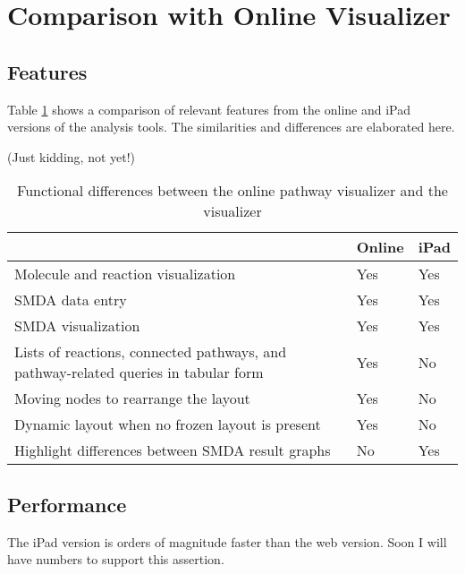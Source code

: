 \section{Comparison with Online \pathcasemaw Visualizer}
\label{sect:maw_comparison}

\subsection{Features}
\label{sect:maw_comparison_features}

Table \ref{fig:maw_comparison_table} shows a comparison of relevant features
from the online and iPad versions of the \pathcasemaw analysis tools. The
similarities and differences are elaborated here.

(Just kidding, not yet!)

\begin{table}[ht!]
\centering
\begin{tabular}{ | p{3in} | l | l | }
    \hline
                        & Online    & iPad \\ \hline

    Molecule and reaction visualization
                        & Yes       & Yes \\ \hline

    SMDA data entry     & Yes       & Yes \\ \hline

    SMDA visualization  & Yes       & Yes \\ \hline

    Lists of reactions, connected pathways, and pathway-related queries in
    tabular form
                        & Yes       & No \\ \hline

    Moving nodes to rearrange the layout
                        & Yes       & No \\ \hline

    Dynamic layout when no frozen layout is present
                        & Yes       & No \\ \hline

    Highlight differences between SMDA result graphs
                        & No        & Yes \\ \hline
\end{tabular}
    \label{fig:maw_comparison_table}
    \caption{Functional differences between the online \pathcasemaw pathway
    visualizer and the \mawapp visualizer}
\end{table}

\subsection{Performance}
\label{sect:maw_comparison_performance}

The iPad version is orders of magnitude faster than the web version. Soon I will
have numbers to support this assertion.

